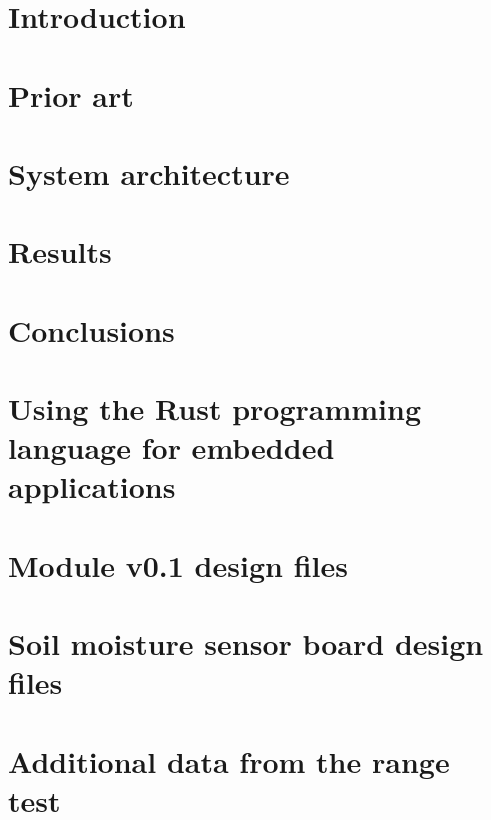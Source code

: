 \documentclass[twoside]{ctuthesis}
\begin{document}
\maketitle


\chapter{\label{chapter:introduction}Introduction}

\chapter{\label{chapter:prior}Prior art}

\chapter{\label{chapter:architecture}System architecture}

\chapter{\label{chapter:results}Results}

\chapter{Conclusions}
\printindex

\begin{appendices}
\chapter{\label{chapter:rust}Using the Rust programming language for embedded applications}

\chapter{\label{chapter:module01-files}Module v0.1 design files}

\chapter{\label{chapter:sensor-files}Soil moisture sensor board design files}

\chapter{\label{chapter:more-range-test}Additional data from the range test}

\end{appendices}



\end{document}
